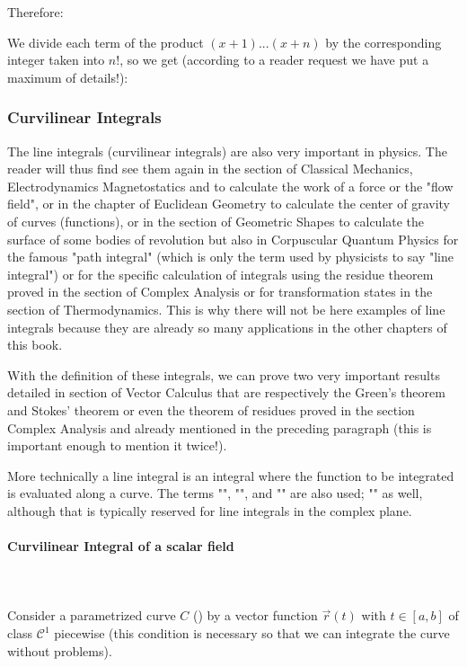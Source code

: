	Therefore:
	
	We divide each term of the product $(x+1)...(x+n)$ by the corresponding integer taken into $n!$, so we get (according to a reader request we have put a maximum of details!):
    
	
	\pagebreak
	\subsubsection{Curvilinear Integrals}\label{curvilinear integral}
	The line integrals (curvilinear integrals) are also very important in physics. The reader will thus find see them again in the section of Classical Mechanics, Electrodynamics Magnetostatics and to calculate the work of a force or the "flow field", or in the chapter of Euclidean Geometry to calculate the center of gravity of curves (functions), or in the section of Geometric Shapes to calculate the surface of some bodies of revolution but also in Corpuscular Quantum Physics for the famous "path integral" (which is only the term used by physicists to say "line integral") or for the specific calculation of integrals using the residue theorem proved in the section of Complex Analysis or for transformation states in the section of Thermodynamics. This is why there will not be here examples of line integrals because they are already so many applications in the other chapters of this book.
	
	With the definition of these integrals, we can prove two very important results detailed in section of Vector Calculus that are respectively the Green's theorem and Stokes' theorem or even the theorem of residues proved in the section Complex Analysis and already mentioned in the preceding paragraph (this is important enough to mention it twice!).
	
	More technically a line integral is an integral where the function to be integrated is evaluated along a curve. The terms "", "", and "" are also used; "" as well, although that is typically reserved for line integrals in the complex plane.
	
	\paragraph{Curvilinear Integral of a scalar field}\mbox{}\\\\
	Consider a parametrized curve $C$ () by a vector function $\vec{r}(t)$ with $t \in [a,b]$ of class $\mathcal{C}^1$ piecewise (this condition is necessary so that we can integrate the curve without problems).
	
